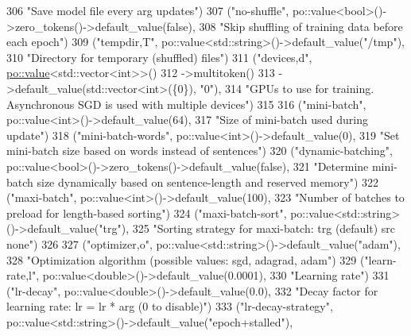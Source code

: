 \begin{DoxyCode}
306       \textcolor{stringliteral}{"Save model file every  arg  updates"})
307     (\textcolor{stringliteral}{"no-shuffle"}, po::value<bool>()->zero\_tokens()->default\_value(\textcolor{keyword}{false}),
308     \textcolor{stringliteral}{"Skip shuffling of training data before each epoch"})
309     (\textcolor{stringliteral}{"tempdir,T"}, po::value<std::string>()->default\_value(\textcolor{stringliteral}{"/tmp"}),
310       \textcolor{stringliteral}{"Directory for temporary (shuffled) files"})
311     (\textcolor{stringliteral}{"devices,d"}, \hyperlink{namespacemarian_1_1keywords_ac70de1b4c3cf6b7080cf5086f2963fd8}{po::value}<std::vector<int>>()
312       ->multitoken()
313       ->default\_value(std::vector<int>(\{0\}), \textcolor{stringliteral}{"0"}),
314       \textcolor{stringliteral}{"GPUs to use for training. Asynchronous SGD is used with multiple devices"})
315 
316     (\textcolor{stringliteral}{"mini-batch"}, po::value<int>()->default\_value(64),
317       \textcolor{stringliteral}{"Size of mini-batch used during update"})
318     (\textcolor{stringliteral}{"mini-batch-words"}, po::value<int>()->default\_value(0),
319       \textcolor{stringliteral}{"Set mini-batch size based on words instead of sentences"})
320     (\textcolor{stringliteral}{"dynamic-batching"}, po::value<bool>()->zero\_tokens()->default\_value(\textcolor{keyword}{false}),
321       \textcolor{stringliteral}{"Determine mini-batch size dynamically based on sentence-length and reserved memory"})
322     (\textcolor{stringliteral}{"maxi-batch"}, po::value<int>()->default\_value(100),
323       \textcolor{stringliteral}{"Number of batches to preload for length-based sorting"})
324     (\textcolor{stringliteral}{"maxi-batch-sort"}, po::value<std::string>()->default\_value(\textcolor{stringliteral}{"trg"}),
325       \textcolor{stringliteral}{"Sorting strategy for maxi-batch: trg (default) src none"})
326 
327     (\textcolor{stringliteral}{"optimizer,o"}, po::value<std::string>()->default\_value(\textcolor{stringliteral}{"adam"}),
328      \textcolor{stringliteral}{"Optimization algorithm (possible values: sgd, adagrad, adam"})
329     (\textcolor{stringliteral}{"learn-rate,l"}, po::value<double>()->default\_value(0.0001),
330      \textcolor{stringliteral}{"Learning rate"})
331     (\textcolor{stringliteral}{"lr-decay"}, po::value<double>()->default\_value(0.0),
332      \textcolor{stringliteral}{"Decay factor for learning rate: lr = lr * arg (0 to disable)"})
333     (\textcolor{stringliteral}{"lr-decay-strategy"}, po::value<std::string>()->default\_value(\textcolor{stringliteral}{"epoch+stalled"}),

\end{DoxyCode}
